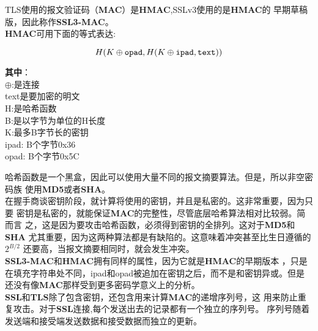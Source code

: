 \documentclass[11pt,dvips]{article}
\newcommand{\bfs}[1]{{\bf{#1}}}
\begin{document}
TLS使用的报文验证码（{\bf{MAC}}）是{\bf{HMAC}},SSLv3使用的是{\bf{HMAC}}的
早期草稿版，因此称作{\bf{SSL3-MAC}}。\\

{\bf{HMAC}}可用下面的等式表达:

\begin{displaymath}
        H(K \oplus {\tt{opad}},H(K \oplus {\tt{ipad}},{\tt{text}}))\\{}
 \end{displaymath}

 \begin{center}
         \begin{minipage}[t]{0.30\textwidth}
                 {\bf{其中}}：\\

        $\oplus$:是连接\\
        text是要加密的明文\\
        H:是哈希函数\\
        B:是以字节为单位的H长度\\
        K:最多B字节长的密钥\\
        ipad:   B个字节0x36\\
        opad:   B个字节0x5C\\
\end{minipage}
\end{center}


哈希函数是一个黑盒，因此可以使用大量不同的报文摘要算法。但是，所以非空密码族
使用{\bf{MD5}}或者{\bf{SHA}}。\\

在握手商谈密钥阶段，就计算将使用的密钥，并且是私密的。这非常重要，因为只要
密钥是私密的，就能保证{\bf{MAC}}的完整性，尽管底层哈希算法相对比较弱。简而言
之，这是因为要攻击哈希函数，必须得到密钥的全排列。这对于{\bf{MD5}}和{\bf{SHA}}
尤其重要，因为这两种算法都是有缺陷的。这意味着冲突甚至比生日遵循的$2^{B/2}$
还要高，当报文摘要相同时，就会发生冲突。\\

{\bf{SSL3-MAC}}和{\bf{HMAC}}拥有同样的属性，因为它就是{\bf{HMAC}}的早期版本
，只是在填充字符串处不同，ipad和opad被追加在密钥之后，而不是和密钥异或。但是
还没有像{\bf{MAC}}那样受到更多密码学意义上的分析。 \\

\bfs{SSL}和\bfs{TLS}除了包含密钥，还包含用来计算\bfs{MAC}的递增序列号，这
用来防止重复攻击。对于\bfs{SSL}连接,每个发送出去的记录都有一个独立的序列号。
序列号随着发送端和接受端发送数据和接受数据而独立的更新。\\
\end{document}
